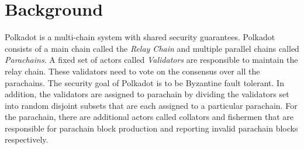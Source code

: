 \section{Background}

Polkadot is a multi-chain system with shared security guarantees.
Polkadot consists of a main chain called the \emph{Relay Chain} and multiple parallel chains called \emph{Parachains}.
A fixed set of actors called \emph{Validators} are responsible to maintain the relay chain.
These validators need to vote on the consensus over all the parachains.
The security goal of Polkadot is to be Byzantine fault tolerant.
In addition, the validators are assigned to parachain by dividing the validators set into
random disjoint subsets that are each assigned to a particular parachain.
For the parachain, there are additional actors called collators and fishermen that are
responsible for parachain block production and reporting invalid parachain blocks respectively.
